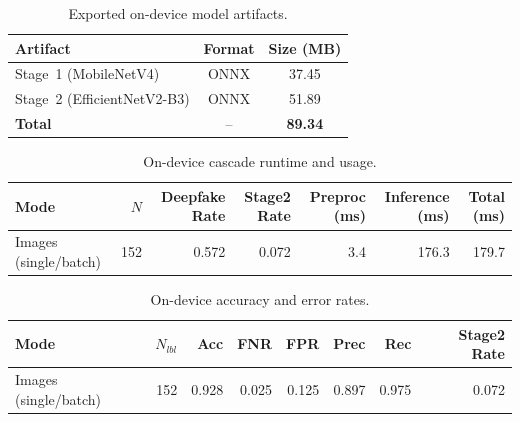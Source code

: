 \begin{table}[h]
  \centering
  \caption{Exported on-device model artifacts.}\label{tab:mobile_artifacts_auto}
  \begin{tabular}{lcc}\toprule
  Artifact & Format & Size (MB) \\ \midrule
  Stage~1 (MobileNetV4) & ONNX & 37.45 \\ 
  Stage~2 (EfficientNetV2-B3) & ONNX & 51.89 \\ 
  \textbf{Total} & -- & \textbf{89.34} \\ 
  \bottomrule\end{tabular}\end{table}

\begin{table}[h]
  \centering
  \caption{On-device cascade runtime and usage.}\label{tab:mobile_runtime_auto}
  \begin{tabular}{lrrrrrr}\toprule
  Mode & $N$ & Deepfake Rate & Stage2 Rate & Preproc (ms) & Inference (ms) & Total (ms) \\ \midrule
  Images (single/batch) & 152 & 0.572 & 0.072 & 3.4 & 176.3 & 179.7 \\ 
  \bottomrule\end{tabular}\end{table}

\begin{table}[h]
  \centering
  \caption{On-device accuracy and error rates.}\label{tab:mobile_accuracy_auto}
  \begin{tabular}{lrrrrrrr}\toprule
  Mode & $N_{lbl}$ & Acc & FNR & FPR & Prec & Rec & Stage2 Rate \\ \midrule
  Images (single/batch) & 152 & 0.928 & 0.025 & 0.125 & 0.897 & 0.975 & 0.072 \\ 
  \bottomrule\end{tabular}\end{table}
